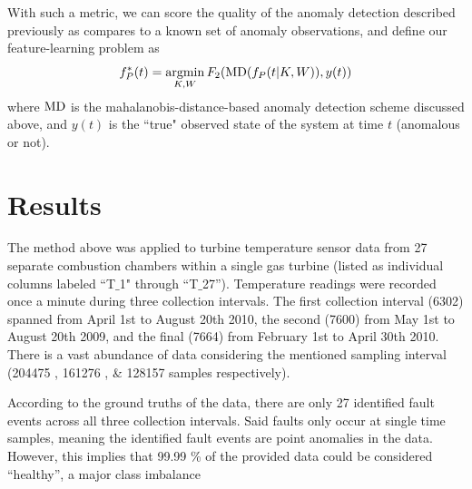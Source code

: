 \documentclass[twocolumn,10pt]{article}
\DeclareMathOperator*{\argmin}{argmin}
\begin{document}
With such a metric, we can score the quality of the anomaly detection described previously as compares to a known set of anomaly observations, and define our feature-learning problem as 
\begin{equation}\label{eq:obj}
    f^*_P(t) = \argmin_{K, W} F_2({\rm MD}(f_P(t|K, W)), y(t))
\end{equation}
where ${\rm MD}$ is the mahalanobis-distance-based anomaly detection scheme discussed above, and $y(t)$ is the ``true" observed state of the system at time $t$ (anomalous or not). 


\section{Results}


The method above was applied to turbine temperature sensor data from 27 separate combustion chambers within a single gas turbine (listed as individual columns labeled ``T$\_$1" through ``T$\_$27”). Temperature readings were recorded once a minute during three collection intervals. The first collection interval (6302) spanned from April 1st to August 20th 2010, the second (7600) from May 1st to August 20th 2009, and the final (7664) from February 1st to April 30th 2010. There is a vast abundance of data considering the mentioned sampling interval (204475 , 161276 , & 128157 samples respectively).

According to the ground truths of the data, there are only
27 identified fault events across all three collection intervals. Said faults only occur at single time
samples, meaning the identified fault events are point anomalies in the data. However, this
implies that 99.99 \% of the provided data could be considered “healthy”, a major class imbalance
\end{document}

